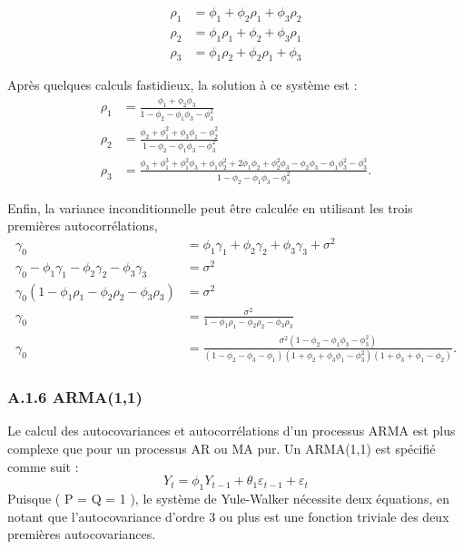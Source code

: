 \documentclass[
  letterpaper,
  DIV=11,
  numbers=noendperiod]{scrartcl}
\begin{document}
\[
\begin{aligned}
\rho_1 &= \phi_1 + \phi_2 \rho_1 + \phi_3 \rho_2 \\
\rho_2 &= \phi_1 \rho_1 + \phi_2 + \phi_3 \rho_1 \\
\rho_3 &= \phi_1 \rho_2 + \phi_2 \rho_1 + \phi_3
\end{aligned}
\]

Après quelques calculs fastidieux, la solution à ce système est : \[
\begin{aligned}
\rho_1 &= \frac{\phi_1 + \phi_2 \phi_3}{1 - \phi_2 - \phi_1 \phi_3 - \phi_3^2} \\
\rho_2 &= \frac{\phi_2 + \phi_1^2 + \phi_3 \phi_1 - \phi_2^2}{1 - \phi_2 - \phi_1 \phi_3 - \phi_3^2} \\
\rho_3 &= \frac{\phi_3 + \phi_1^3 + \phi_1^2 \phi_3 + \phi_1 \phi_2^2 + 2 \phi_1 \phi_2 + \phi_2^2 \phi_3 - \phi_2 \phi_3 - \phi_1 \phi_3^2 - \phi_3^3}{1 - \phi_2 - \phi_1 \phi_3 - \phi_3^2}.
\end{aligned}
\]

Enfin, la variance inconditionnelle peut être calculée en utilisant les
trois premières autocorrélations, \[
\begin{aligned}
\gamma_0 &= \phi_1 \gamma_1 + \phi_2 \gamma_2 + \phi_3 \gamma_3 + \sigma^2 \\
\gamma_0 - \phi_1 \gamma_1 - \phi_2 \gamma_2 - \phi_3 \gamma_3 &= \sigma^2 \\
\gamma_0 (1 - \phi_1 \rho_1 - \phi_2 \rho_2 - \phi_3 \rho_3) &= \sigma^2 \\
\gamma_0 &= \frac{\sigma^2}{1 - \phi_1 \rho_1 - \phi_2 \rho_2 - \phi_3 \rho_3} \\
\gamma_0 &= \frac{\sigma^2 (1 - \phi_2 - \phi_1 \phi_3 - \phi_3^2)}{(1 - \phi_2 - \phi_3 - \phi_1)(1 + \phi_2 + \phi_3 \phi_1 - \phi_3^2)(1 + \phi_3 + \phi_1 - \phi_2)}.
\end{aligned}
\]

\subsubsection{A.1.6 ARMA(1,1)}\label{a.1.6-arma11}

Le calcul des autocovariances et autocorrélations d'un processus ARMA
est plus complexe que pour un processus AR ou MA pur. Un ARMA(1,1) est
spécifié comme suit : \[
Y_t = \phi_1 Y_{t-1} + \theta_1 \varepsilon_{t-1} + \varepsilon_t
\] Puisque ( P = Q = 1 ), le système de Yule-Walker nécessite deux
équations, en notant que l'autocovariance d'ordre 3 ou plus est une
fonction triviale des deux premières autocovariances.
\end{document}
